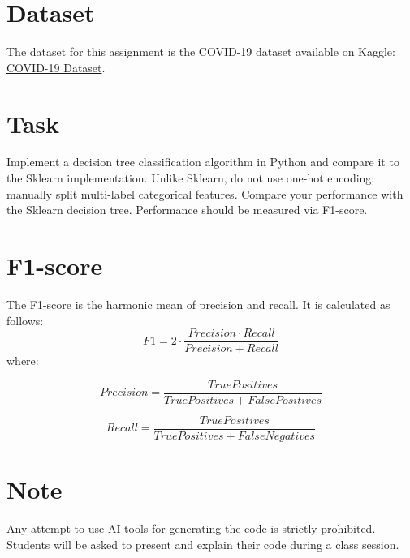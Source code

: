 \documentclass{article}
\begin{document}
	\section*{Dataset}
	The dataset for this assignment is the COVID-19 dataset available on Kaggle: \href{https://www.kaggle.com/datasets/meirnizri/covid19-dataset}{COVID-19 Dataset}.
	
	\section*{Task}
	Implement a decision tree classification algorithm in Python and compare it to the Sklearn implementation. Unlike Sklearn, do not use one-hot encoding; manually split multi-label categorical features. Compare your performance with the Sklearn decision tree. Performance should be measured via F1-score.
	\section*{F1-score}
	The F1-score is the harmonic mean of precision and recall. It is calculated as follows:
	$$
	F1 = 2 \cdot \frac{{Precision \cdot Recall}}{{Precision + Recall}}
	$$
	where:
	
	$$
	Precision = \frac{{True Positives}}{{True Positives + False Positives}}
	$$
	
	$$
	Recall = \frac{{True Positives}}{{True Positives + False Negatives}}
	$$
	
	\section*{Note}
	Any attempt to use AI tools for generating the code is strictly prohibited. Students will be asked to present and explain their code during a class session.
\end{document}
